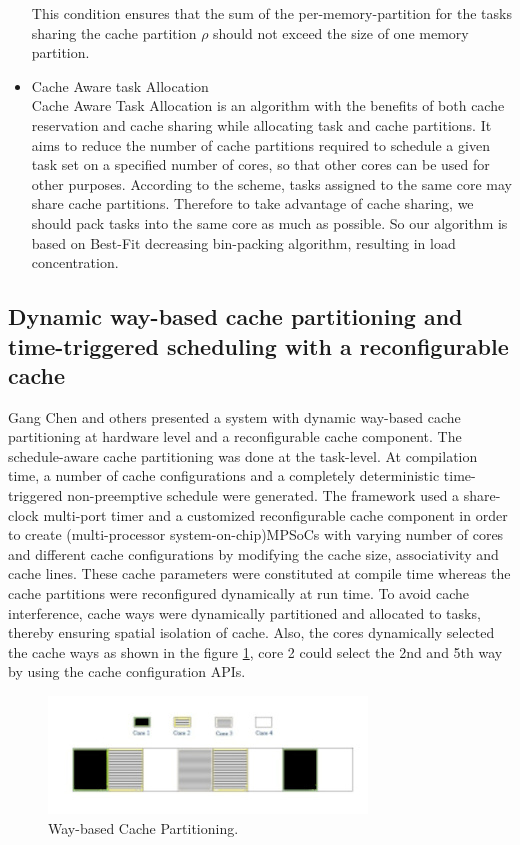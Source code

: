 \documentclass[conference]{IEEEtran}
\begin{document}
\begin{itemize}
    This condition ensures that the sum of the per-memory-partition for the tasks sharing the cache partition $\rho$ should not exceed the size of one memory partition.
    \item Cache Aware task Allocation\\
    Cache Aware Task Allocation is an algorithm with the benefits of both cache reservation and cache sharing while allocating task and cache partitions. It aims to reduce the number of cache partitions required to schedule a given task set on a specified number of cores, so that other cores can be used for other purposes.
    According to the scheme, tasks assigned to the same core may share cache partitions. Therefore to take advantage of cache sharing, we should pack tasks into the same core as much as possible. So our algorithm is based on Best-Fit decreasing bin-packing algorithm, resulting in load concentration.
    \end{itemize}
    
\subsection{\textbf{Dynamic way-based cache partitioning and time-triggered scheduling with a reconfigurable cache\cite{b3}}}
    Gang Chen and others\cite{b3} presented a system with dynamic way-based cache
    partitioning at hardware level and a reconfigurable cache component. The schedule-aware  cache partitioning was done at the task-level. At compilation time, a number of cache configurations and a completely deterministic time-triggered non-preemptive schedule were generated. The framework used a share-clock multi-port timer and a customized reconfigurable cache component in order to create (multi-processor system-on-chip)MPSoCs with varying number of cores and different cache configurations by modifying the cache size, associativity and cache lines. These cache parameters were constituted at compile time whereas the cache partitions were reconfigured dynamically at run time. To avoid cache interference, cache ways were dynamically partitioned and allocated to tasks, thereby ensuring spatial isolation of cache. Also, the cores dynamically selected the cache ways as shown in the figure \ref{fig_c_1}, core 2 could select the 2nd and 5th way by using the cache configuration APIs.

    \begin{figure}[htbp]
        \centerline{\includegraphics{CacheWayPartitioning_1.jpg}}
        \caption{Way-based Cache Partitioning.\cite{b3}}
        \label{fig_c_1}
    \end{figure}
\end{document}
